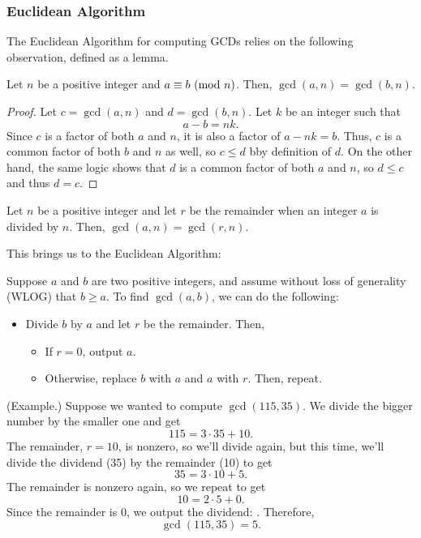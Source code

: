 \documentclass[letterpaper]{article}
\newcommand{\0}{\mathbf{0}}
\begin{document}
\subsubsection{Euclidean Algorithm}
The Euclidean Algorithm for computing GCDs relies on the following observation, defined as a lemma. 
\begin{lemma}{}{}
    Let $n$ be a positive integer and $a \equiv b \ (\mathrm{mod}\ n)$. Then, $\gcd(a, n) = \gcd(b, n)$. 
\end{lemma}

\begin{proof}
    Let $c = \gcd(a, n)$ and $d = \gcd(b, n)$. Let $k$ be an integer such that \[a - b = nk.\] Since $c$ is a factor of both $a$ and $n$, it is also a factor of $a - nk = b$. Thus, $c$ is a common factor of both $b$ and $n$ as well, so $c \leq d$ bby definition of $d$. On the other hand, the same logic shows that $d$ is a common factor of both $a$ and $n$, so $d \leq c$ and thus $d = c$. 
\end{proof}

\begin{corollary}{}{}
    Let $n$ be a positive integer and let $r$ be the remainder when an integer $a$ is divided by $n$. Then, $\gcd(a, n) = \gcd(r, n)$. 
\end{corollary}

This brings us to the Euclidean Algorithm: 
\begin{mdframed}
    Suppose $a$ and $b$ are two positive integers, and assume without loss of generality (WLOG) that $b \geq a$. To find $\gcd(a, b)$, we can do the following: 
    \begin{itemize}
        \item Divide $b$ by $a$ and let $r$ be the remainder. Then, 
        \begin{itemize}
            \item If $r = 0$, output $a$. 
            \item Otherwise, replace $b$ with $a$ and $a$ with $r$. Then, repeat. 
        \end{itemize}
    \end{itemize}
\end{mdframed}

\begin{mdframed}
    (Example.) Suppose we wanted to compute $\gcd(115, 35)$. We divide the bigger number by the smaller one and get 
    \[115 = 3 \cdot 35 + 10.\]
    The remainder, $r = 10$, is nonzero, so we'll divide again, but this time, we'll divide the dividend (35) by the remainder (10) to get 
    \[35 = 3 \cdot 10 + 5.\]
    The remainder is nonzero again, so we repeat to get 
    \[10 = 2 \cdot 5 + 0.\]
    Since the remainder is 0, we output the dividend: . Therefore, 
    \[\gcd(115, 35) = 5.\]
\end{mdframed}
\end{document}
